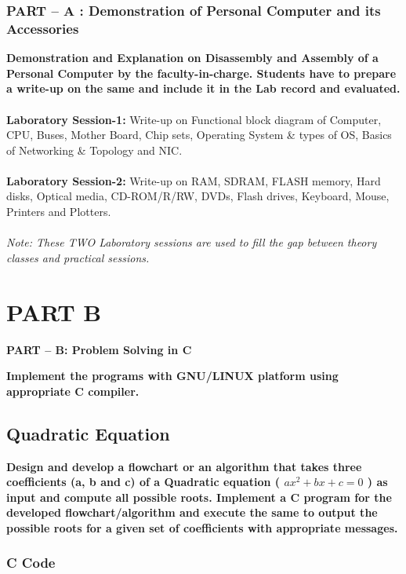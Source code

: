 \documentclass[a4paper]{report}
\begin{document}
\section*{PART – A : Demonstration of Personal Computer and its Accessories}
\textbf{Demonstration and Explanation on Disassembly and Assembly of a Personal Computer by the faculty-in-charge. Students have to prepare a write-up on the same and include it in the Lab record and evaluated.\\ \\}
\textbf{Laboratory Session-1:} Write-up on Functional block diagram of Computer, CPU, Buses, Mother Board, Chip sets, Operating System \& types of OS, Basics of Networking \& Topology and NIC.\\ \\
\textbf{Laboratory Session-2:} Write-up on RAM, SDRAM, FLASH memory, Hard disks, Optical media, CD-ROM/R/RW, DVDs, Flash drives, Keyboard, Mouse, Printers and Plotters.\\ \\
\textit{Note: These TWO Laboratory sessions are used to fill the gap between theory classes and practical sessions.
}
\part{PART B}
\begin{center}
\textbf{PART – B: Problem Solving in C \\}\end{center}
\textbf{Implement the programs with GNU/LINUX platform using appropriate C compiler.}

\chapter{Quadratic Equation}
{\selectfont \textbf{Design and develop a flowchart or an algorithm that takes three coefficients (a, b and c) of a Quadratic equation ( \(ax^{2}+bx+c=0\) ) as input and compute all possible roots. Implement a C program for the developed flowchart/algorithm and execute the same to output the possible roots for a given set of coefficients with appropriate messages.
}}

\section*{C Code}
\end{document}
